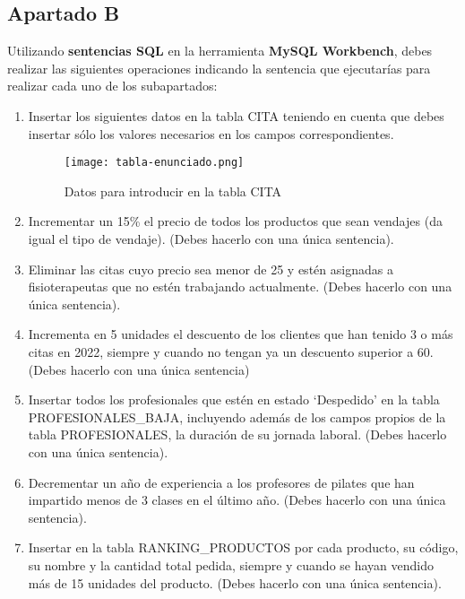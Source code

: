 \subsection{Apartado B}
Utilizando \textbf{sentencias SQL} en la herramienta \textbf{MySQL Workbench}, debes realizar las siguientes operaciones indicando la sentencia que ejecutarías para realizar cada uno de los subapartados:

\begin{enumerate}
    \item Insertar los siguientes datos en la tabla CITA teniendo en cuenta que debes insertar sólo los valores necesarios en los campos correspondientes.

    \begin{figure}[H]
        \centering
        \texttt{[image: tabla-enunciado.png]}
        \caption{Datos para introducir en la tabla CITA}
    \end{figure}

    \item Incrementar un 15\% el precio de todos los productos que sean vendajes (da igual el tipo de vendaje). (Debes hacerlo con una única sentencia).

    \item Eliminar las citas cuyo precio sea menor de 25 y estén asignadas a fisioterapeutas que no estén trabajando actualmente. (Debes hacerlo con una única sentencia).

    \item Incrementa en 5 unidades el descuento de los clientes que han tenido 3 o más citas en 2022, siempre y cuando no tengan ya un descuento superior a 60. (Debes hacerlo con una única sentencia)

    \item Insertar todos los profesionales que estén en estado ‘Despedido’ en la tabla PROFESIONALES\_BAJA, incluyendo además de los campos propios de la tabla PROFESIONALES, la duración de su jornada laboral. (Debes hacerlo con una única sentencia).

    \item Decrementar un año de experiencia a los profesores de pilates que han impartido menos de 3 clases en el último año. (Debes hacerlo con una única sentencia).

    \item Insertar en la tabla RANKING\_PRODUCTOS por cada producto, su código, su nombre y la cantidad total pedida, siempre y cuando se hayan vendido más de 15 unidades del producto. (Debes hacerlo con una única sentencia).


\end{enumerate}
